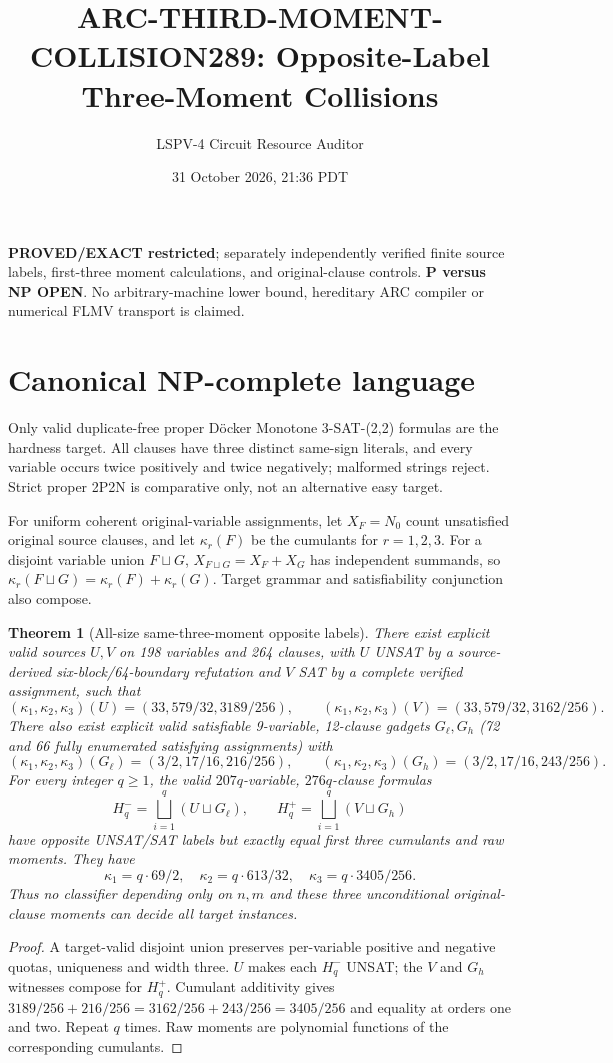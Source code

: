 \documentclass[10pt]{article}
\title{ARC-THIRD-MOMENT-COLLISION289: Opposite-Label Three-Moment Collisions}
\author{LSPV-4 Circuit Resource Auditor}
\date{31 October 2026, 21:36 PDT}
\newtheorem{theorem}{Theorem}
\begin{document}
\maketitle
\noindent\textbf{PROVED/EXACT restricted}; separately independently verified finite source labels, first-three moment calculations, and original-clause controls. \textbf{P versus NP OPEN}. No arbitrary-machine lower bound, hereditary ARC compiler or numerical FLMV transport is claimed.

\section*{Canonical NP-complete language}
Only valid duplicate-free proper D\"ocker Monotone 3-SAT-(2,2) formulas are the hardness target. All clauses have three distinct same-sign literals, and every variable occurs twice positively and twice negatively; malformed strings reject. Strict proper 2P2N is comparative only, not an alternative easy target.

For uniform coherent original-variable assignments, let $X_F=N_0$ count unsatisfied original source clauses, and let $\kappa_r(F)$ be the cumulants for $r=1,2,3$. For a disjoint variable union $F\sqcup G$, $X_{F\sqcup G}=X_F+X_G$ has independent summands, so $\kappa_r(F\sqcup G)=\kappa_r(F)+\kappa_r(G)$. Target grammar and satisfiability conjunction also compose.

\begin{theorem}[All-size same-three-moment opposite labels]
There exist explicit valid sources $U,V$ on 198 variables and 264 clauses, with $U$ UNSAT by a source-derived six-block/64-boundary refutation and $V$ SAT by a complete verified assignment, such that
\[
 (\kappa_1,\kappa_2,\kappa_3)(U)=(33,579/32,3189/256),\qquad
 (\kappa_1,\kappa_2,\kappa_3)(V)=(33,579/32,3162/256).
\]
There also exist explicit valid satisfiable 9-variable, 12-clause gadgets $G_\ell,G_h$ (72 and 66 fully enumerated satisfying assignments) with
\[
 (\kappa_1,\kappa_2,\kappa_3)(G_\ell)=(3/2,17/16,216/256),\qquad
 (\kappa_1,\kappa_2,\kappa_3)(G_h)=(3/2,17/16,243/256).
\]
For every integer $q\ge1$, the valid $207q$-variable, $276q$-clause formulas
\[
 H_q^- = \bigsqcup_{i=1}^q(U\sqcup G_\ell),
 \qquad H_q^+ = \bigsqcup_{i=1}^q(V\sqcup G_h)
\]
have opposite UNSAT/SAT labels but exactly equal first three cumulants and raw moments. They have
\[
 \kappa_1=q\cdot69/2,\quad \kappa_2=q\cdot613/32,\quad \kappa_3=q\cdot3405/256.
\]
Thus no classifier depending only on $n,m$ and these three unconditional original-clause moments can decide all target instances.
\end{theorem}
\begin{proof} A target-valid disjoint union preserves per-variable positive and negative quotas, uniqueness and width three. $U$ makes each $H_q^-$ UNSAT; the $V$ and $G_h$ witnesses compose for $H_q^+$. Cumulant additivity gives $3189/256+216/256=3162/256+243/256=3405/256$ and equality at orders one and two. Repeat $q$ times. Raw moments are polynomial functions of the corresponding cumulants.\end{proof}
\end{document}
